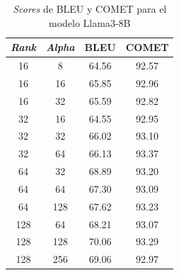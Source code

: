 \documentclass[11pt,spanish,listoffigures,listoftables]{tfgetsinf}
\begin{document}
\begin{table}[!h]
\caption{\textit{Scores} de BLEU y COMET para el modelo Llama3-8B}
\begin{center}
\begin{tabular}{ c c | c c }
	\hline
	\textit{Rank} & \textit{Alpha} & BLEU & COMET \\
	\hline
	\hline
	16 & 8 & 64.56 & 92.57 \\
	16 & 16 & 65.85 & 92.96 \\
	16 & 32 & 65.59 & 92.82 \\
	\hline
	32 & 16 & 64.55 & 92.95 \\
	32 & 32 & 66.02 & 93.10 \\
	32 & 64 &  66.13 & 93.37 \\
	\hline
	64 & 32 & 68.89 & 93.20\\
	64 & 64 & 67.30 & 93.09\\
	64 & 128 & 67.62 & 93.23\\
	\hline
	128 & 64 & 68.21 & 93.07\\
	128 & 128 & 70.06 & 93.29\\
	128 & 256 & 69.06 & 92.97\\
	

\end{tabular}
\end{center}
\label{tab: Llama exploración de alpha}
\end{table}
\end{document}

